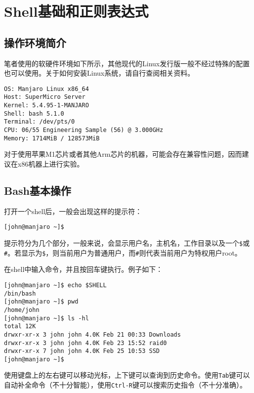 \section{Shell基础和正则表达式}

\subsection{操作环境简介}
笔者使用的软硬件环境如下所示，其他现代的Linux发行版一般不经过特殊的配置也可以使用。关于如何安装Linux系统，请自行查阅相关资料。
\begin{lstlisting}[frame=none]
OS: Manjaro Linux x86_64 
Host: SuperMicro Server
Kernel: 5.4.95-1-MANJARO 
Shell: bash 5.1.0 
Terminal: /dev/pts/0 
CPU: 06/55 Engineering Sample (56) @ 3.000GHz 
Memory: 1714MiB / 128573MiB 
\end{lstlisting}

对于使用苹果M1芯片或者其他Arm芯片的机器，可能会存在兼容性问题，因而建议在x86机器上进行实验。

\subsection{Bash基本操作}
打开一个shell后，一般会出现这样的提示符：
\begin{lstlisting}[frame=none]
[john@manjaro ~]$ 
\end{lstlisting}
提示符分为几个部分，一般来说，会显示用户名，主机名，工作目录以及一个\texttt{\$}或\texttt{\#}。若显示为\texttt{\$}，则当前用户为普通用户，而\texttt{\#}则代表当前用户为特权用户root。

在shell中输入命令，并且按回车键执行。例子如下：
\begin{lstlisting}[frame=none]
[john@manjaro ~]$ echo $SHELL
/bin/bash
[john@manjaro ~]$ pwd
/home/john
[john@manjaro ~]$ ls -hl
total 12K
drwxr-xr-x 3 john john 4.0K Feb 21 00:33 Downloads
drwxr-xr-x 3 john john 4.0K Feb 23 15:52 raid0
drwxr-xr-x 7 john john 4.0K Feb 25 10:53 SSD
[john@manjaro ~]$ 
\end{lstlisting}

使用键盘上的左右键可以移动光标，上下键可以查询到历史命令。使用\texttt{Tab}键可以自动补全命令（不十分智能），使用\texttt{Ctrl-R}键可以搜索历史指令（不十分准确）。

